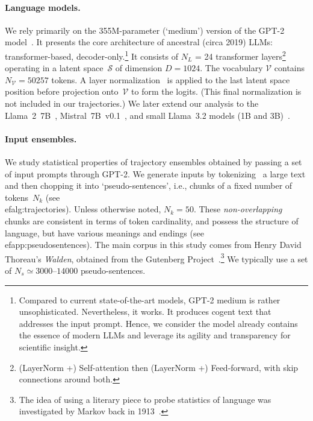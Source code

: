 \documentclass{article} %
\begin{document}
\paragraph{Language models.}
We rely primarily on the 355M-parameter (`medium') version of the GPT-2 model~\citep{radford2019language}. 
It presents the core architecture of ancestral (circa 2019) LLMs: transformer-based, decoder-only.\footnote{
Compared to current state-of-the-art models, GPT-2 medium is rather unsophisticated.
Nevertheless, it works. 
It produces cogent text that addresses the input prompt.
Hence, we consider the model already contains the essence of modern LLMs and leverage its agility and transparency for scientific insight.} 
It consists of $N_L$ = 24 transformer layers\footnote{(LayerNorm +) Self-attention then (LayerNorm +) Feed-forward, with skip connections around both.} 
operating in a latent space~$\mathcal{S}$ of dimension $D = 1024$. 
The vocabulary $\mathcal{V}$ contains $N_\mathcal{V} = 50257$ tokens.
A layer normalization~\citep{ba2016layernormalization} is applied to the last latent space position before projection onto~$\mathcal{V}$ to form the logits. (This final normalization is not included in our trajectories.)
We later extend our analysis to the Llama~2~7B~\citep{touvron2023llama2openfoundation}, Mistral~7B~v0.1~\citep{jiang2023mistral7b}, and small Llama~3.2 models (1B and 3B)~\citep{meta2024llama3_2}. 


\paragraph{Input ensembles.}
We study statistical properties of trajectory ensembles obtained by passing a set of input prompts through GPT-2.
We generate inputs by tokenizing~\citep{wolf2020huggingfacestransformersstateoftheartnatural} a large text and then chopping it into `pseudo-sentences', i.e., chunks of a fixed number of tokens~$N_k$ (see \\ef{alg:trajectories}). 
Unless otherwise noted, $N_k = 50$.
These \emph{non-overlapping} chunks are consistent in terms of token cardinality, and possess the structure of language, but have various meanings and endings (see \\ef{app:pseudosentences}).
The main corpus in this study comes from Henry David Thoreau's \textit{Walden}, obtained from the Gutenberg Project~\citep{gutenberg_project}.\footnote{
The idea of using a literary piece to probe statistics of language was investigated by Markov back in 1913~\citep{Markov_2006}.
} 
We typically use a set of $N_s \simeq 3000 \text{--} 14000$ pseudo-sentences.
\end{document}
